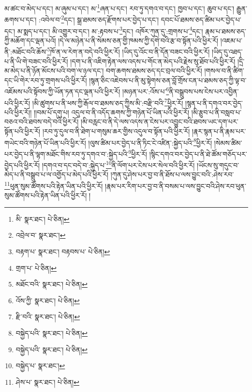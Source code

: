 མ་ཚང་བ་མེད་པ་དང་། མ་ཞུམ་པ་དང་། མ་\footnote{མི་  སྣར་ཐང་།  པེ་ཅིན། }ཞན་པ་དང་། རབ་ཏུ་དགའ་བ་དང་། ཁྱབ་པ་དང་། ཆུབ་པ་དང་། རྒྱུན་ཆགས་པ་དང་། :འབེལ་བ་\footnote{འབྲེལ་བ་  སྣར་ཐང་། }དང་། སྒྲ་ཐམས་ཅད་རྫོགས་པར་བྱེད་པ་དང་། དབང་པོ་ཐམས་ཅད་ཚིམ་པར་བྱེད་པ་དང་། མ་སྨད་པ་དང་། མི་འགྱུར་བ་དང་། མ་:རྟབས་པ་\footnote{བརྟག་པ་  སྣར་ཐང་། བརྟབས་པ་  པེ་ཅིན། }དང་། འཁོར་ཀུན་དུ་:གྲགས་པ་\footnote{གྲག་པ་  པེ་ཅིན། }དང་། རྣམ་པ་ཐམས་ཅད་ཀྱི་མཆོག་དང་ལྡན་པའོ། །དེ་ལ་མཉེན་པ་ནི་སེམས་ཅན་གྱི་ཁམས་ཀྱི་དགེ་བའི་རྩ་བ་སྟོན་པའི་ཕྱིར་རོ། །འཇམ་པ་ནི་:མཐོང་བའི་ཆོས་\footnote{མཐོང་བའི་  སྣར་ཐང་།  པེ་ཅིན། }ཁོ་ན་ལ་རེག་ན་བདེ་བའི་ཕྱིར་རོ། །ཡིད་དུ་འོང་བ་ནི་དོན་བཟང་བའི་ཕྱིར་རོ། །ཡིད་དུ་འཐད་པ་ནི་ཡི་གེ་བཟང་བའི་ཕྱིར་རོ། །དག་པ་ནི་འཇིག་རྟེན་ལས་འདས་པ་གོང་ན་མེད་པའི་རྗེས་སུ་ཐོབ་པའི་ཕྱིར་རོ། །དྲི་མ་མེད་པ་ནི་ཉོན་མོངས་པའི་བག་ལ་ཉལ་དང་། བག་ཆགས་ཐམས་ཅད་དང་བྲལ་བའི་ཕྱིར་རོ། །གསལ་བ་ནི་ཚིག་དང་ཡི་གེར་རབ་ཏུ་གྲགས་པའི་ཕྱིར་རོ། །སྙན་ཅིང་འཇེབས་པ་ནི་མུ་སྟེགས་ཅན་བློ་གྲོས་ངན་པ་ཐམས་ཅད་ཀྱི་ལྟ་བ་འཇོམས་པའི་སྟོབས་ཀྱི་ཡོན་ཏན་དང་ལྡན་པའི་ཕྱིར་རོ། །མཉན་པར་:འོས་པ་\footnote{འོས་ཀྱི་  སྣར་ཐང་།  པེ་ཅིན། }ནི་བསྒྲུབས་པས་ངེས་པར་འབྱིན་པའི་ཕྱིར་རོ། །མི་ཚུགས་པ་ནི་ཕས་ཀྱི་རྒོལ་བ་ཐམས་ཅད་ཀྱིས་མི་:བརྫི་བའི་\footnote{རྫི་བའི་  སྣར་ཐང་།  པེ་ཅིན། }ཕྱིར་རོ། །སྙན་པ་ནི་དགའ་བར་བྱེད་པའི་ཕྱིར་རོ།། །།བམ་པོ་དགུ་པ། འདུལ་བ་ནི་འདོད་ཆགས་ཀྱི་གཉེན་པོ་ཡིན་པའི་ཕྱིར་རོ། །མི་རྩུབ་པ་ནི་བསླབ་པ་བཅའ་བའི་ཐབས་བདེ་བའི་ཕྱིར་རོ། །མི་བརླང་བ་ནི་དེ་ལས་འདས་ན་ངེས་པར་འབྱུང་བའི་ཐབས་ཡང་དག་པར་སྟོན་པའི་ཕྱིར་རོ། །རབ་ཏུ་དུལ་བ་ནི་ཐེག་པ་གསུམ་ཆར་གྱིས་འདུལ་བ་སྟོན་པའི་ཕྱིར་རོ། །རྣར་སྙན་པ་ནི་རྣམ་པར་གཡེང་བའི་གཉེན་པོ་ཡིན་པའི་ཕྱིར་རོ། །ལུས་ཚིམ་པར་བྱེད་པ་ནི་ཏིང་ངེ་འཛིན་:སྐྱེད་པའི་\footnote{བསྐྱེད་པའི་  སྣར་ཐང་།  པེ་ཅིན། }ཕྱིར་རོ། །སེམས་ཚིམ་པར་བྱེད་པ་ནི་ལྷག་མཐོང་གིས་རབ་ཏུ་དགའ་བ་:སྐྱེད་པའི་\footnote{བསྐྱེད་པའི་  སྣར་ཐང་།  པེ་ཅིན། }ཕྱིར་རོ། །སྙིང་དགའ་བར་བྱེད་པ་ནི་ཐེ་ཚོམ་གཅོད་པར་བྱེད་པའི་ཕྱིར་རོ། །དགའ་བ་དང་བདེ་བ་:སྐྱེད་པ་\footnote{བསྐྱེད་པ་  སྣར་ཐང་། }ནི་ལོག་པར་ངེས་པར་སེལ་བའི་ཕྱིར་རོ། །ཡོངས་སུ་གདུང་བ་མེད་པ་ནི་བསྒྲུབ་པ་ལ་འགྱོད་པ་མེད་པའི་ཕྱིར་རོ། །ཀུན་དུ་ཤེས་པར་བྱ་བ་ནི་ཐོས་པ་ལས་བྱུང་བའི་:ཤེས་རབ་\footnote{ཤེས་པ་  སྣར་ཐང་།  པེ་ཅིན། }ཕུན་སུམ་ཚོགས་པའི་རྟེན་ཡིན་པའི་ཕྱིར་རོ། །རྣམ་པར་རིག་པར་བྱ་བ་ནི་བསམ་པ་ལས་བྱུང་བའི་ཤེས་རབ་ཕུན་སུམ་ཚོགས་པའི་རྟེན་ཡིན་པའི་ཕྱིར་རོ། །
